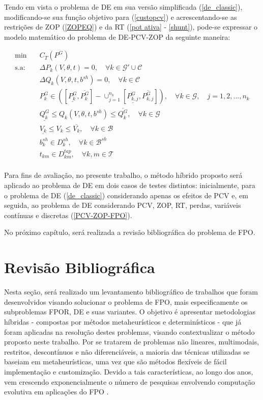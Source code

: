 \documentclass[
	12pt,				%
	openany,			%
	twoside,			%
	a4paper,			%
	chapter=TITLE,		%
	section=Title,		%
	subsection=Title,	%
	subsubsection=Title,%
	english,			%
	french,				%
	spanish,			%
	brazil			%
	]{abntex2}
\begin{document}
\begin{ERRATA}
Tendo em vista o problema de DE em sua versão simplificada (\ref{de_classic}), modificando-se sua função objetivo para (\ref{custopcv}) e acrescentando-se as restrições de ZOP (\ref{ZOPEQ}) e da RT (\ref{pot ativa} - \ref{shunt}), pode-se expressar o modelo matemático do problema de DE-PCV-ZOP da seguinte maneira:

\begin{equation} \label{PCV-ZOP-FPO}
\begin{aligned}
\text{min}  &\quad C_T(P^{G})  \\
\text{s.a:} &\quad   \Delta P_k(V,\theta,t) = 0, \quad \forall k \in \mathcal{G}' \cup \mathcal{C} \\
&\quad   \Delta Q_k(V,\theta,t, b^{sh}) = 0, \quad \forall k \in \mathcal{C} \quad\\
&\quad P^{G}_k \in ([\underline{P^{G}_k}, \overline{P^{G}_k}]-\cup_{j=1}^{n_k}[\underline{P^{G}_{k,j}}, \overline{P^{G}_{k,j}}]), \quad \forall k \in \mathcal{G}, \quad j = 1,2,...,n_k\\
&\quad \underline{Q^{G}_{k}} \leq Q_{k}(V,\theta,t,b^{sh}) \leq \overline{Q^{G}_{k}}, \quad  \forall k \in \mathcal{G}\\
&\quad \underline{V_{k}} \leq V_{k} \leq \overline{V_{k}}, \quad  \forall k \in \mathcal{B}\\
&\quad b^{sh}_{k} \in D_{k}^{sh}, \quad \forall k \in \mathcal{B}^{sh}\\
&\quad t_{km} \in D_{km}^{tap},\quad \forall k,m \in \mathcal{T} \\
\end{aligned}
\end{equation}

Para fins de avaliação, no presente trabalho, o método híbrido proposto será aplicado ao problema de DE em dois casos de testes distintos: inicialmente, para o problema de DE (\ref{de_classic}) considerando apenas os efeitos de PCV e, em seguida, ao problema de DE considerando PCV, ZOP, RT, perdas, variáveis contínuas e discretas (\ref{PCV-ZOP-FPO}).

No próximo capítulo, será realizada a revisão bibliográfica do problema de FPO.

\section{Revisão Bibliográfica}

Nesta seção, será realizado um levantamento bibliográfico de trabalhos que foram desenvolvidos visando solucionar o problema de FPO, mais especificamente os subproblemas FPOR, DE e suas variantes. O objetivo é apresentar metodologias híbridas - compostas por métodos metaheurísticos e determinísticos - que já foram aplicadas na resolução destes problemas, visando contextualizar o método proposto neste trabalho. Por se tratarem de problemas não lineares, multimodais, restritos, descontínuos e não diferenciáveis, a maioria das técnicas utilizadas se baseiam em metaheurísticas, uma vez que são métodos flexíveis de fácil implementação e customização. Devido a tais características, ao longo dos anos, vem crescendo exponencialmente o número de pesquisas envolvendo computação evolutiva em aplicações do FPO \cite{metareview}.


\end{ERRATA}
\end{document}
